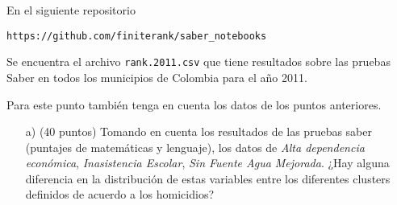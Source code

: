 \documentclass{article}
\begin{document}
\begin{enumerate}
En el siguiente repositorio 

\verb"https://github.com/finiterank/saber_notebooks"

Se encuentra el archivo \verb"rank.2011.csv" que tiene resultados
sobre las pruebas Saber en todos los municipios de Colombia para el
año 2011. 

Para este punto tambi\'en tenga en cuenta los datos de los puntos anteriores.

\begin{itemize}
  \item[a)] (40 puntos) Tomando en cuenta los resultados de las pruebas saber
    (puntajes de matem\'aticas y lenguaje), los datos de \emph{Alta
    dependencia econ\'omica}, \emph{Inasistencia Escolar}, \emph{Sin
    Fuente Agua Mejorada}. ¿Hay alguna diferencia en la distribución
    de estas variables entre los diferentes clusters definidos de
    acuerdo a los homicidios?    
\end{itemize}

\end{enumerate}
\end{document}
